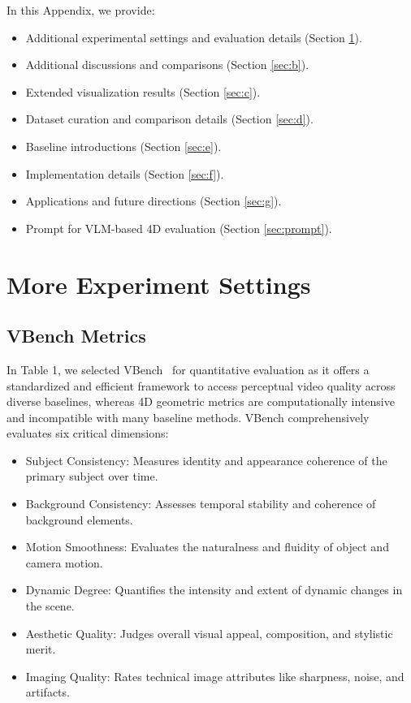 
\renewcommand\thesection{\Alph{section}} 
\renewcommand\thetable{\Alph{table}}
\renewcommand\thefigure{\Alph{figure}}
\setcounter{section}{0}
\setcounter{figure}{0}
\setcounter{table}{0}


\noindent In this Appendix, we provide:
\begin{itemize}
    \item Additional experimental settings and evaluation details (Section \ref{sec:a}).
    \item Additional discussions and comparisons (Section \ref{sec:b}).
    \item Extended visualization results (Section \ref{sec:c}).
    \item Dataset curation and comparison details (Section \ref{sec:d}).
    \item Baseline introductions (Section \ref{sec:e}).
    \item Implementation details (Section \ref{sec:f}).
    \item Applications and future directions (Section \ref{sec:g}).
    \item Prompt for VLM-based 4D evaluation (Section \ref{sec:prompt}).
\end{itemize}

\section{More Experiment Settings}
\label{sec:a}


\subsection{VBench Metrics}

\label{app:vbench_metrics}

In Table 1, we selected VBench~\cite{vbench} for quantitative evaluation as it offers a standardized and efficient framework to access perceptual video quality across diverse baselines, whereas 4D geometric metrics are computationally intensive and incompatible with many baseline methods. VBench comprehensively evaluates six critical dimensions:

\begin{itemize}
    \item {Subject Consistency}: Measures identity and appearance coherence of the primary subject over time.
    \item {Background Consistency}: Assesses temporal stability and coherence of background elements.
    \item {Motion Smoothness}: Evaluates the naturalness and fluidity of object and camera motion.
    \item {Dynamic Degree}: Quantifies the intensity and extent of dynamic changes in the scene.
    \item {Aesthetic Quality}: Judges overall visual appeal, composition, and stylistic merit.
    \item {Imaging Quality}: Rates technical image attributes like sharpness, noise, and artifacts.
\end{itemize}

